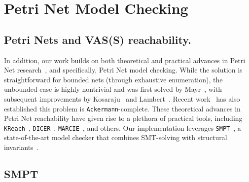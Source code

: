

\section{Petri Net Model Checking}
\label{appendix:smpt}


\subsection{Petri Nets and VAS(S) reachability.}
	
	In addition, our work builds on both theoretical and practical advances in 
	Petri Net research~\cite{Mu89, Es96, Re12, EsNi24}, and specifically, Petri Net model checking.
	While the solution is 
	straightforward for bounded nets (through exhaustive enumeration), the unbounded case is highly nontrivial and was first solved by 
	Mayr~\cite{Ma81}, with subsequent improvements by Kosaraju~\cite{Ko82} and 
	Lambert~\cite{La92}. Recent work~\cite{CzWo22} has also established this 
	problem is \texttt{Ackermann}-complete.
	These theoretical advances in Petri Net reachability have given rise to a 
	plethora of practical tools, including \texttt{KReach}~\cite{DiLa20}, 
	\texttt{DICER}~\cite{XiZhLi21}, \texttt{MARCIE}~\cite{HeRoSc13}, and others. 
	Our implementation leverages \texttt{SMPT}~\cite{AmDa23}, a state-of-the-art model checker that combines SMT-solving with structural invariants~\cite{AmBeDa21,AmDaHu22}.
	
	
\subsection{SMPT}


